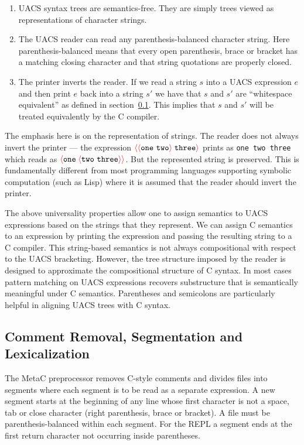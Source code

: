 \documentclass{article}
\newcommand{\fopen}{{\color{red} \langle}}
\newcommand{\fclose}{{\color{red} \rangle}}
\begin{document}
\begin{enumerate}
\item UACS syntax trees are semantics-free.  They are simply trees viewed as representations of character strings.

\item The UACS reader can read any parenthesis-balanced character string.
  Here parenthesis-balanced means that every open parenthesis, brace or bracket has a matching closing character and that string quotations
  are properly closed.
  
\item The printer inverts the reader. If we read a string $s$ into a UACS expression
  $e$ and then print $e$ back into a string $s'$ we have that $s$ and $s'$ are ``whitespace equivalent'' as defined in section~\ref{sec:lex}.
  This implies that $s$ and $s'$ will be treated equivalently by the C compiler.
\end{enumerate}

The emphasis here is on the representation of strings.  The reader does not always invert the printer ---
the expression $\fopen \fopen \mathtt{one~two} \fclose \;\mathtt{three}\fclose$ prints as {\tt one two three} which reads as
$\fopen \mathtt{one}\; \fopen \mathtt{two~three} \fclose \fclose$.  But the represented string is preserved.  This is fundamentally different from
most programming languages supporting symbolic computation (such as Lisp) where it is assumed that the reader should invert the printer.

The above universality properties allow one to assign semantics to UACS expressions based on the strings that they represent.  We can assign C
semantics to an expression by printing the expression and passing the resulting string to a C compiler.  This string-based semantics is not always
compositional with respect to the UACS bracketing.  However, the tree structure imposed by the reader is designed to approximate the
compositional structure of C syntax.  In most cases pattern matching on UACS expressions recovers substructure that is semantically meaningful under C
semantics. Parentheses and semicolons are particularly helpful in aligning UACS trees with C syntax.

\subsection{Comment Removal, Segmentation and Lexicalization}
\label{sec:lex}

The MetaC preprocessor removes C-style comments and divides files into segments where each segment is to be read as a separate expression.
A new segment starts at the beginning of any line whose first character is not a space, tab or close character (right parenthesis, brace or bracket).
A file must be parenthesis-balanced within each segment.
For the REPL a segment ends at the first return character not occurring inside parentheses.
\end{document}
